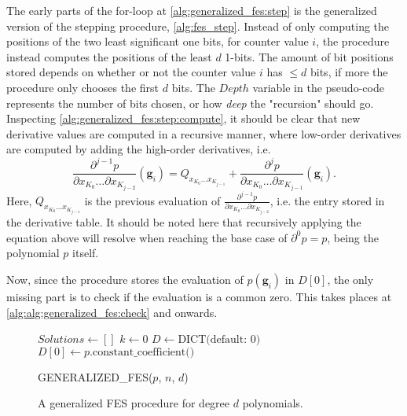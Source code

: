 The early parts of the for-loop at \cref{alg:generalized_fes:step} is the generalized version of the stepping procedure, \cref{alg:fes_step}. Instead of only computing the positions of the two least significant one bits, for counter value $i$, the procedure instead computes the positions of the least $d$ 1-bits. The amount of bit positions stored depends on whether or not the counter value $i$ has $\leq d$ bits, if more the procedure only chooses the first $d$ bits. The $Depth$ variable in the pseudo-code represents the number of bits chosen, or how \textit{deep} the "recursion" should go. Inspecting \cref{alg:generalized_fes:step:compute}, it should be clear that new derivative values are computed in a recursive manner, where low-order derivatives are computed by adding the high-order derivatives, i.e.
\begin{equation} \label{eq:fes_recurse}
    \frac{\partial^{j - 1} p}{\partial x_{K_0} \dots \partial x_{K_{j - 2}}}(\mathbf{g}_i) = Q_{x_{K_0} \dots x_{K_{j - 1}}} + \frac{\partial^j p}{\partial x_{K_0} \dots \partial x_{K_{j - 1}}}(\mathbf{g}_i).
\end{equation}
Here, $Q_{x_{K_0} \dots x_{K_{j - 1}}}$ is the previous evaluation of $\frac{\partial^{j - 1} p}{\partial x_{K_0} \dots \partial x_{K_{j - 2}}}$, i.e. the entry stored in the derivative table. It should be noted here that recursively applying the equation above will resolve when reaching the base case of $\partial^0 p = p$, being the polynomial $p$ itself.

Now, since the procedure stores the evaluation of $p(\mathbf{g}_i)$ in $D[0]$, the only missing part is to check if the evaluation is a common zero. This takes places at \cref{alg:alg:generalized_fes:check} and onwards.

\begin{figure}[t]
    \begin{alg}
        $Solutions \gets []$\;
        $k \gets 0$\;
        $D \gets \text{DICT(default: 0)}$\;
        $D[0] \gets p.\text{constant\_coefficient()}$\;
        \ForEach{$i = 0, \dots 2^n - 1$}{ \label{alg:generalized_fes:step}
            $Depth \gets \min(\text{HAMMING\_WEIGHT}(i), d)$\;
            $K \gets \text{BITS}(i, Depth)$\;
            \ForEach{$j = Depth \dots, 1$}{
                $D[K_{0\dots j - 1}] \gets D[K_{0\dots j - 1}]] \oplus D[K_{0\dots j}]$\; \label{alg:generalized_fes:step:compute}
            }
            \If{$D[0] = 0$}{ \label{alg:alg:generalized_fes:check}
                $Solutions[k] \gets \text{GRAY}(i)$\;
                $k\pp$\;
            }
        }
        \caption{GENERALIZED\_FES($p$, $n$, $d$)} \label{alg:generalized_fes}
    \end{alg}
    \caption{A generalized FES procedure for degree $d$ polynomials.}
\end{figure}

